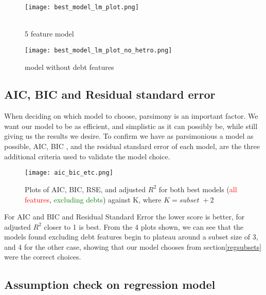 \documentclass[journal]{IEEEtran}
\begin{document}
\begin{figure}[h] 
\centering
\begin{minipage}{.25\textwidth}
  \centering
  \texttt{[image: best\_model\_lm\_plot.png]}
  \caption{\\5 feature model}
  \label{fig:best_model_lm_pl}
\end{minipage}%
\begin{minipage}{.25\textwidth}
  \centering
  \texttt{[image: best\_model\_lm\_plot\_no\_hetro.png]}
  \caption{model without debt features}
  \label{fig:best_model_lm_pl_no_hetro}
\end{minipage}
\end{figure}
\subsection{AIC, BIC and Residual standard error }
When deciding on which model to choose, parsimony is an important factor. We want our model to be as efficient, and simplistic as it can possibly be, while still giving us the results we desire. \cite{parsimony} To confirm we have as parsimonious a model as possible, AIC\cite{aic}, BIC \cite{bic}, and the residual standard error of each model, are the three additional criteria used to validate the model choice.  
\begin{figure}[h]
    \centering
    \texttt{[image: aic\_bic\_etc.png]}
    \caption{Plots of AIC, BIC, RSE, and adjusted $R^2$ for both best models (\textcolor{red}{all features}, \textcolor{green}{excluding debts}) against K, where $K = subset \; +2$}
    \label{fig:aic_etc}
\end{figure}
\indent For AIC and BIC and Residual Standard Error the lower score is better, for adjusted $R^2$ closer to 1 is best. From the 4 plots shown, we can see that the models found excluding debt features begin to plateau around a subset size of 3, and 4 for the other case, showing that our model chooses from section\ref{regsubsets} were the correct choices. 
\subsection{Assumption check on regression model}
\end{document}
